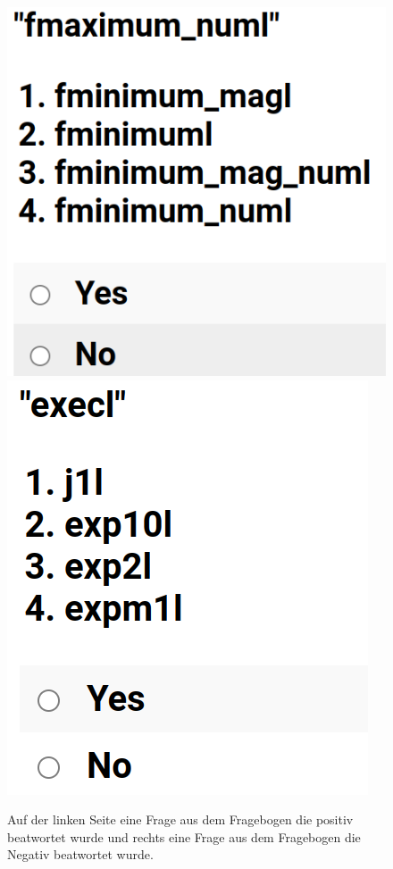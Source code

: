 \documentclass[12pt,letterpaper,ngerman]{article}
\begin{document}
\begin{figure}[H]
  \begin{center}
    \includegraphics[scale=0.3]{abb/survey-example-positive.png}
    \includegraphics[scale=0.3]{abb/survey-example-negative.png}
  \end{center}
  \caption{
    Auf der linken Seite eine Frage aus dem Fragebogen die positiv
    beatwortet wurde und rechts eine Frage aus dem Fragebogen die Negativ
    beatwortet wurde.
  }
\end{figure}
\end{document}
